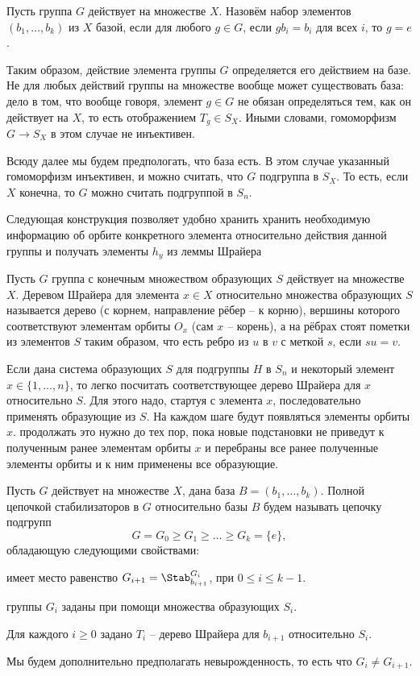 \dfn[База] Пусть группа $G$ действует на множестве $X$. Назовём набор элементов $(b_1,\dots,b_k)$ из $X$ базой, если для любого $ g\in G$, если $gb_i=b_i$ для всех $i$, то $g=e$.
\edfn

Таким образом, действие элемента группы $G$ определяется его действием на базе. Не для любых действий группы на множестве вообще может существовать база: дело в том, что вообще говоря, элемент $g\in G$ не обязан определяться тем, как он действует на $X$, то есть отображением $T_g\in S_X$. Иными словами, гомоморфизм $G\to S_X$ в этом случае не инъективен. 

Всюду далее мы будем предпологать, что база есть. В этом случае указанный гомоморфизм инъективен, и можно считать, что $G$ подгруппа в $S_X$. То есть, если $X$ конечна, то $G$ можно считать подгруппой в $S_n$. 

Следующая конструкция позволяет удобно хранить хранить необходимую информацию об орбите конкретного элемента относительно действия данной группы и получать элементы $h_y$ из леммы Шрайера


 Пусть $G$ группа с конечным множеством образующих $S$ действует на множестве $X$. Деревом Шрайера для элемента $x\in X$ относительно множества образующих $S$ называется дерево (с корнем, направление рёбер -- к корню), вершины которого соответствуют элементам орбиты $O_x$ (сам $x$ -- корень), а на рёбрах стоят пометки из элементов $S$ таким образом, что есть ребро из $u$ в $v$ с меткой $s$, если $su=v$.
\edfn

Если дана система образующих $S$ для подгруппы $H$ в $S_n$ и некоторый элемент $x\in \{1,\dots,n\}$, то легко посчитать соответствующее дерево Шрайера для $x$ относительно $S$. Для этого надо, стартуя с элемента $x$, последовательно применять образующие из $S$. На каждом шаге будут появляться элементы орбиты $x$. продолжать это нужно до тех пор, пока новые подстановки не приведут к  полученным  ранее элементам орбиты $x$ и перебраны все ранее полученные элементы орбиты и к ним применены все образующие.

 Пусть $G$ действует на множестве $X$, дана база $B=(b_1,\dots,b_k)$. Полной цепочкой стабилизаторов в $G$ относительно базы $B$ будем называть цепочку подгрупп 
$$G=G_0\geq G_1 \geq \dots \geq G_k=\{e\},$$
обладающую следующими свойствами:
\enm
\item имеет место равенство $G_{i+1}=\Stab_{b_{i+1}}^{G_i}$, при $0\leq i\leq k-1$.
\item группы $G_i$ заданы при помощи множества образующих $S_i$.
\item Для каждого $i\geq 0$ задано $T_i$ -- дерево Шрайера для $b_{i+1}$ относительно $S_i$.
\item Мы будем дополнительно предполагать невырожденность, то есть что $G_i\neq G_{i+1}$.
\eenm
\edfn

